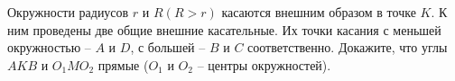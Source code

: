\begin{ex}
	\begin{condition}
		Окружности радиусов \( r \) и \( R (R > r)  \) касаются внешним образом в точке \( K \). К ним проведены две общие внешние касательные. Их точки касания с меньшей окружностью – \( A  \) и \( D \), с большей – \( B  \) и \( C  \) соответственно. Докажите, что углы \( AKB  \) и \( O_1MO_2 \) прямые (\( O_1  \) и \( O_2 \) – центры окружностей).
	\end{condition}
\end{ex}